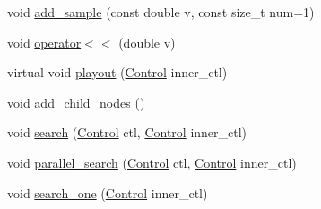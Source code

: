 \begin{DoxyCompactItemize}
\item 
void \hyperlink{class_m_c_t_s_node_abf621592d6d9add273696fa2b7cce9f1}{add\+\_\+sample} (const double v, const size\+\_\+t num=1)
\item 
void \hyperlink{class_m_c_t_s_node_a8bcef9cd7a6e04b9835b632bc98faa6d}{operator$<$$<$} (double v)
\item 
virtual void \hyperlink{class_m_c_t_s_node_aee6d20621c57a00b8abe0ef4f7d0ee8c}{playout} (\hyperlink{struct_control}{Control} inner\+\_\+ctl)
\item 
void \hyperlink{class_m_c_t_s_node_aaaa81cd44588bfa06d172881d22722ab}{add\+\_\+child\+\_\+nodes} ()
\item 
void \hyperlink{class_m_c_t_s_node_ac62bd50472a606d1002f44de2021c77e}{search} (\hyperlink{struct_control}{Control} ctl, \hyperlink{struct_control}{Control} inner\+\_\+ctl)
\item 
void \hyperlink{class_m_c_t_s_node_a3053a6c46cf2205879c555ddc3936be9}{parallel\+\_\+search} (\hyperlink{struct_control}{Control} ctl, \hyperlink{struct_control}{Control} inner\+\_\+ctl)
\item 
void \hyperlink{class_m_c_t_s_node_ad35e1c5b66975ff4fea36fbec33e2acd}{search\+\_\+one} (\hyperlink{struct_control}{Control} inner\+\_\+ctl)
\end{DoxyCompactItemize}
